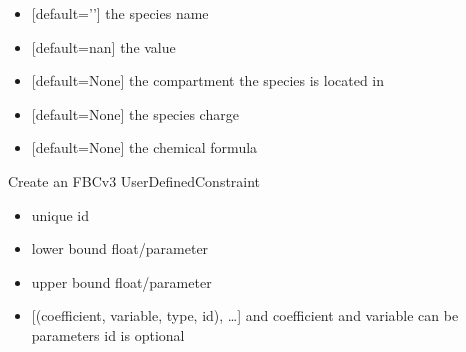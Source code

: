 \documentclass[letterpaper,10pt,english]{sphinxmanual}
\begin{document}
\begin{fulllineitems}
\begin{fulllineitems}
\begin{itemize}
\item {} 
\sphinxAtStartPar
{} {[}default=’’{]} the species name

\item {} 
\sphinxAtStartPar
{} {[}default=nan{]} the value 

\item {} 
\sphinxAtStartPar
{} {[}default=None{]} the compartment the species is located in

\item {} 
\sphinxAtStartPar
{} {[}default=None{]} the species charge

\item {} 
\sphinxAtStartPar
{} {[}default=None{]} the chemical formula

\end{itemize}

\end{fulllineitems}


\begin{fulllineitems}
\label{\detokenize{modules_doc:cbmpy.CBModel.Model.createUserDefinedConstraint}}
\pysigstartsignatures
{}
\pysigstopsignatures
\sphinxAtStartPar
Create an FBCv3 UserDefinedConstraint
\begin{itemize}
\item {} 
\sphinxAtStartPar
{} unique id

\item {} 
\sphinxAtStartPar
{} lower bound float/parameter

\item {} 
\sphinxAtStartPar
{} upper bound float/parameter

\item {} \begin{description}
\sphinxAtStartPar
{[}(coefficient, variable, type, id), …{]} and coefficient and variable can be parameters
id is optional


\end{description}
\end{itemize}
\end{fulllineitems}
\end{fulllineitems}
\end{document}
